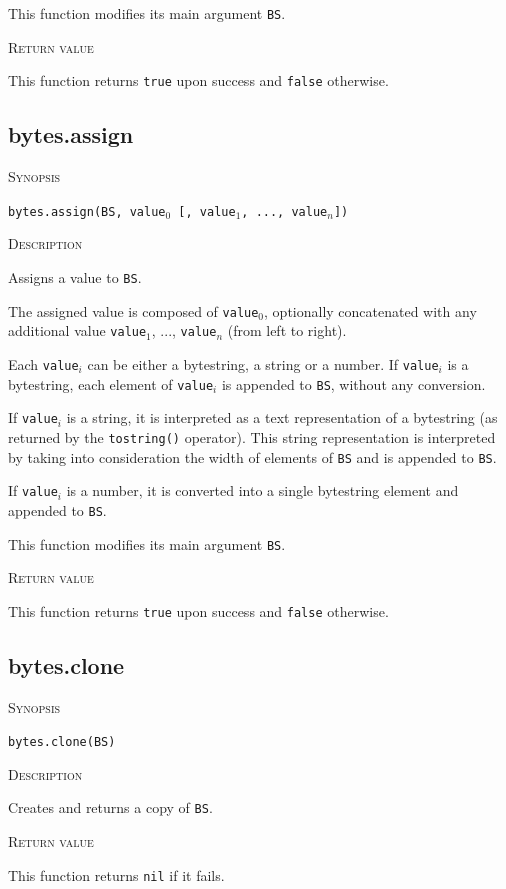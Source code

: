 \documentclass[11pt]{report}
\newcommand{\mansection}[1]{\vspace{0.5em}\par\noindent\textsc{#1}\vspace{0.5em}\par}
\newcommand{\syn}[1]{\texttt{#1}}
\begin{document}
This function modifies its main argument \syn{BS}.

\mansection{Return value}

This function returns \syn{true} upon success and \syn{false} otherwise.

\subsection{bytes.assign}

\mansection{Synopsis}
\syn{bytes.assign(BS, \syn{value$_0$} [, \syn{value$_1$}, ..., \syn{value$_n$}])}

\mansection{Description}

  Assigns a value to \syn{BS}. 

  The assigned value is composed of \syn{value$_0$}, optionally concatenated with 
  any additional value \syn{value$_1$}, ..., \syn{value$_n$} (from left to right).

  Each \syn{value$_i$} can be either a bytestring, a string or a number.
  If \syn{value$_i$} is a bytestring, each element of \syn{value$_i$} is appended to \syn{BS}, 
  without any conversion.

  If \syn{value$_i$} is a string, it is interpreted as a text representation of
  a bytestring (as returned by the \syn{tostring()} operator). This string
  representation is interpreted by taking into consideration the width 
  of elements of \syn{BS} and is appended to \syn{BS}.

  If \syn{value$_i$} is a number, it is converted into a single bytestring element and 
  appended to \syn{BS}.

  This function modifies its main argument \syn{BS}.

\mansection{Return value}

  This function returns \syn{true} upon success and \syn{false} otherwise.

\subsection{bytes.clone}

\mansection{Synopsis}
\syn{bytes.clone(BS)}

\mansection{Description}
  Creates and returns a copy of \syn{BS}.

\mansection{Return value}
  This function returns \syn{nil} if it fails.
\end{document}
